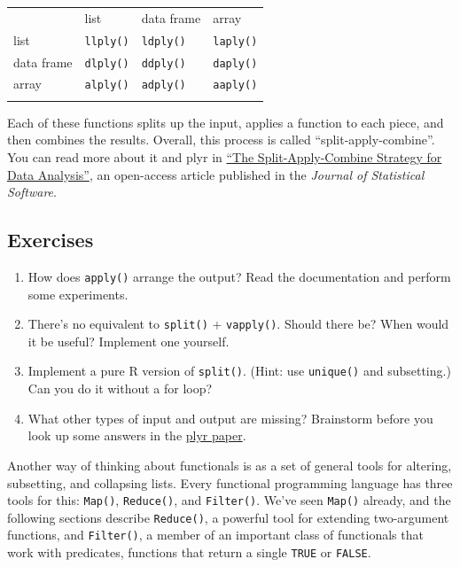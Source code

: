 \begin{longtable}[c]{@{}llll@{}}
\toprule\addlinespace
& list & data frame & array
\\\addlinespace
\midrule\endhead
list & \texttt{llply()} & \texttt{ldply()} & \texttt{laply()}
\\\addlinespace
data frame & \texttt{dlply()} & \texttt{ddply()} & \texttt{daply()}
\\\addlinespace
array & \texttt{alply()} & \texttt{adply()} & \texttt{aaply()}
\\\addlinespace
\bottomrule
\end{longtable}

Each of these functions splits up the input, applies a function to each
piece, and then combines the results. Overall, this process is called
``split-apply-combine''. You can read more about it and plyr in
\href{http://www.jstatsoft.org/v40/i01/}{``The Split-Apply-Combine
Strategy for Data Analysis''}, an open-access article published in the
\emph{Journal of Statistical Software}.

\subsection{Exercises}

\begin{enumerate}
\def\labelenumi{\arabic{enumi}.}
\item
  How does \texttt{apply()} arrange the output? Read the documentation
  and perform some experiments.
\item
  There's no equivalent to \texttt{split()} + \texttt{vapply()}. Should
  there be? When would it be useful? Implement one yourself.
\item
  Implement a pure R version of \texttt{split()}. (Hint: use
  \texttt{unique()} and subsetting.) Can you do it without a for loop?
\item
  What other types of input and output are missing? Brainstorm before
  you look up some answers in the
  \href{http://www.jstatsoft.org/v40/i01/}{plyr paper}.
\end{enumerate}


Another way of thinking about functionals is as a set of general tools
for altering, subsetting, and collapsing lists. Every functional
programming language has three tools for this: \texttt{Map()},
\texttt{Reduce()}, and \texttt{Filter()}. We've seen \texttt{Map()}
already, and the following sections describe \texttt{Reduce()}, a
powerful tool for extending two-argument functions, and
\texttt{Filter()}, a member of an important class of functionals that
work with predicates, functions that return a single \texttt{TRUE} or
\texttt{FALSE}.

